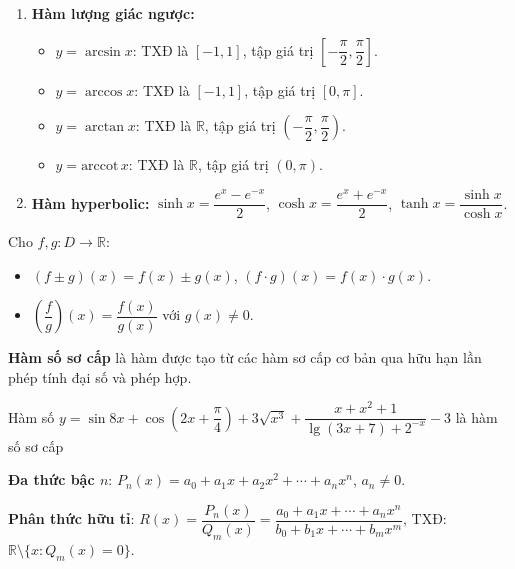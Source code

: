 \documentclass[12pt,a4paper]{article}
\begin{document}
\begin{congthuc}[title={Bảng hàm số sơ cấp cơ bản}]
\begin{enumerate}
\begin{itemize}
    \end{itemize}
    \item \textbf{Hàm lượng giác ngược:}
      \begin{itemize}
        \item $y = \arcsin x$: TXĐ là $[-1, 1]$, tập giá trị $\left[-\dfrac{\pi}{2}, \dfrac{\pi}{2}\right]$.
        \item $y = \arccos x$: TXĐ là $[-1, 1]$, tập giá trị $[0, \pi]$.
        \item $y = \arctan x$: TXĐ là $\mathbb{R}$, tập giá trị $\left(-\dfrac{\pi}{2}, \dfrac{\pi}{2}\right)$.
        \item $y = \text{arccot}\, x$: TXĐ là $\mathbb{R}$, tập giá trị $(0, \pi)$.
      \end{itemize}
    \item \textbf{Hàm hyperbolic:} $\sinh x = \dfrac{e^x - e^{-x}}{2}$, \;$\cosh x = \dfrac{e^x + e^{-x}}{2}$, \;$\tanh x = \dfrac{\sinh x}{\cosh x}$.
  \end{enumerate}
\end{congthuc}

\begin{tinhchat}[title={Tổng, hiệu, tích, thương hàm số}]
  Cho $f, g: D \to \mathbb{R}$:
  \begin{itemize}
    \item $(f \pm g)(x) = f(x) \pm g(x)$, \quad $(f \cdot g)(x) = f(x) \cdot g(x)$.
    \item $\left(\dfrac{f}{g}\right)(x) = \dfrac{f(x)}{g(x)}$ với $g(x) \ne 0$.
  \end{itemize}
  \textbf{Hàm số sơ cấp} là hàm được tạo từ các hàm sơ cấp cơ bản qua hữu hạn lần phép tính đại số và phép hợp.
\end{tinhchat}

\begin{vidu}
    Hàm số $y = \sin 8x + \cos (2x+ \dfrac{\pi}{4}) + 3\sqrt{x^3} + \dfrac{x + x^2 + 1}{\lg(3x + 7) + 2^{-x}} - 3$ là hàm số sơ cấp
\end{vidu}

\begin{dinhnghia}[title={Đa thức và phân thức hữu tỉ}]
  \textbf{Đa thức bậc $n$}: $P_n(x) = a_0 + a_1 x + a_2 x^2 + \cdots + a_n x^n$, $a_n \ne 0$.

  \textbf{Phân thức hữu tỉ}: $R(x) = \dfrac{P_n(x)}{Q_m(x)} = \dfrac{a_0 + a_1 x + \cdots + a_n x^n}{b_0 + b_1 x + \cdots + b_m x^m}$, TXĐ: $\mathbb{R} \setminus \{x : Q_m(x) = 0\}$.
\end{dinhnghia}
\end{document}
